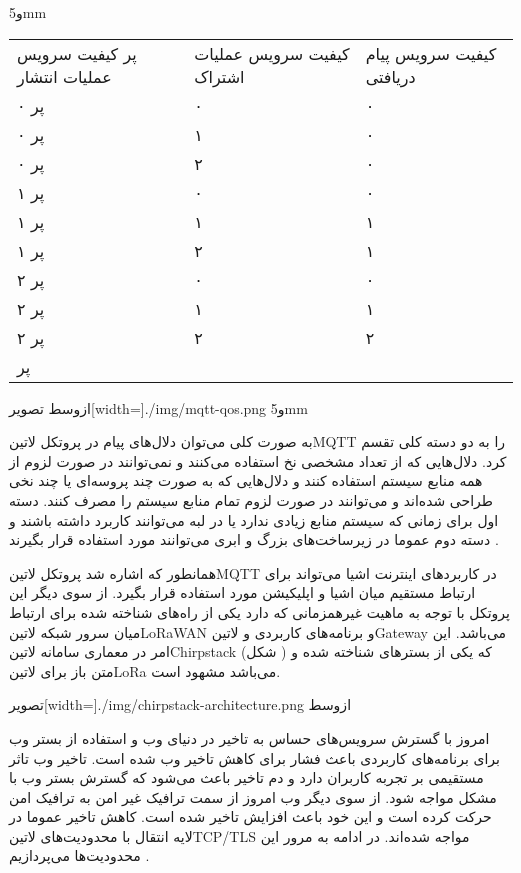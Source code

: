 ‌و{5mm}
\begin{tabularx}{\textwidth}{|X|X|X|}
‌پر
کیفیت سرویس عملیات انتشار & کیفیت سرویس عملیات اشتراک & کیفیت سرویس پیام دریافتی \\
‌پر
۰ & ۰ & ۰ \\
‌پر
۰ & ۱ & ۰ \\
‌پر
۰ & ۲ & ۰ \\
‌پر
۱ & ۰ & ۰ \\
‌پر
۱ & ۱ & ۱ \\
‌پر
۱ & ۲ & ۱ \\
‌پر
۲ & ۰ & ۰ \\
‌پر
۲ & ۱ & ۱ \\
‌پر
۲ & ۲ & ۲ \\
‌پر
\end{tabularx}

‌ازوسط
‌تصویر[width=\textwidth]{./img/mqtt-qos.png}
‌و{5mm}

به صورت کلی می‌توان دلال‌های پیام در پروتکل ‌لاتین{MQTT} را به دو دسته کلی تقسم کرد. دلال‌هایی که از تعداد مشخصی نخ استفاده می‌کنند و نمی‌توانند در صورت لزوم از همه منابع سیستم استفاده کنند و دلال‌هایی که به صورت چند پروسه‌ای یا چند نخی طراحی شده‌اند
و می‌توانند در صورت لزوم تمام منابع سیستم را مصرف کنند. دسته اول برای زمانی که سیستم منابع زیادی ندارد یا در لبه می‌توانند کاربرد داشته باشند و دسته دوم عموما در زیرساخت‌های بزرگ و ابری می‌توانند مورد استفاده قرار بگیرند
.

همانطور که اشاره شد پروتکل ‌لاتین{MQTT} در کاربردهای اینترنت اشیا می‌تواند برای ارتباط مستقیم میان اشیا و اپلیکیشن مورد استفاده قرار بگیرد. از سوی دیگر این پروتکل با توجه به ماهیت غیرهمزمانی که دارد یکی از راه‌های شناخته شده برای ارتباط میان سرور شبکه ‌لاتین{LoRaWAN}
و برنامه‌های کاربردی و ‌لاتین{Gateway} می‌باشد. این امر در معماری سامانه ‌لاتین{Chirpstack} (شکل ) که یکی از بسترهای شناخته شده و متن باز برای ‌لاتین{LoRa} می‌باشد مشهود است.

‌تصویر[width=\textwidth]{./img/chirpstack-architecture.png}
‌ازوسط


امروز با گسترش سرویس‌های حساس به تاخیر در دنیای وب و استفاده از بستر وب برای برنامه‌های کاربردی باعث فشار برای کاهش تاخیر وب شده است. تاخیر وب تاثر مستقیمی بر تجربه کاربران دارد
و دم تاخیر باعث می‌شود که گسترش بستر وب با مشکل مواجه شود.
از سوی دیگر وب امروز از سمت ترافیک غیر امن به ترافیک امن حرکت کرده است و این خود باعث افزایش تاخیر شده است.
کاهش تاخیر عموما در لایه انتقال با محدودیت‌های ‌لاتین{TCP/TLS} مواجه شده‌اند. در ادامه به مرور این محدودیت‌ها می‌پردازیم
.

